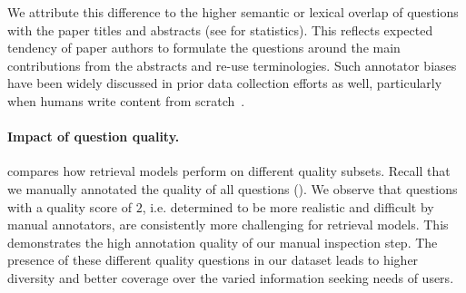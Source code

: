 We attribute this difference to the higher semantic or lexical overlap of \authorq{} questions with the paper titles and abstracts (see  for statistics). 
This reflects expected tendency of paper authors to formulate the questions around the main contributions from the abstracts and re-use terminologies. Such annotator biases have been widely discussed in prior data collection efforts as well, particularly when humans write content from scratch~\citep{gururangan-etal-2018-annotation}.

\begin{table}[t]
    \centering
    \small
    \caption{
       Comparison of retrieval performance on different quality (qual) questions. Generally, retrievers report lower performance on the Qual=2 questions, i.e. those deemed more challenging in our manual annotation. 
    }
    \vspace{-5pt}
    \label{table:result_question_quality}
\end{table}

\paragraph{Impact of question quality.}
\label{sec:quality}

 compares how retrieval models perform on different quality subsets. Recall that we manually annotated the quality of all questions (). We observe that questions with a quality score of $2$, i.e. determined to be more realistic and difficult by manual annotators, are consistently more challenging for retrieval models. This demonstrates the high annotation quality of our manual inspection step. The presence of these different quality questions in our dataset leads to higher diversity and better coverage over the varied information seeking needs of users. 

